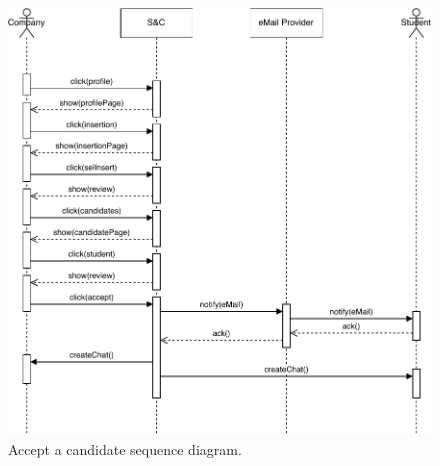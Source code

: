 \begin{figure}[H]
    \begin{center}
        \includegraphics[width=\linewidth]{Images/SequenceDiagram/AcceptCandidateSD.pdf}
        \caption{Accept a candidate sequence diagram.}
        \label{fig:accept_a_candidate_seqdiag}%
    \end{center}
\end{figure}


